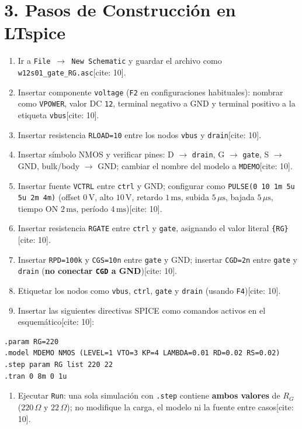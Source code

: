 \documentclass[11pt, a4paper]{article}
\begin{document}
\section*{3. Pasos de Construcción en LTspice}
\begin{enumerate}[noitemsep]
    \item Ir a \texttt{File $\to$ New Schematic} y guardar el archivo como \texttt{w12s01\_gate\_RG.asc}[cite: 10].
    \item Insertar componente \texttt{voltage} (\texttt{F2} en configuraciones habituales): nombrar como \texttt{VPOWER}, valor DC \texttt{12}, terminal negativo a GND y terminal positivo a la etiqueta \texttt{vbus}[cite: 10].
    \item Insertar resistencia \texttt{RLOAD=10} entre los nodos \texttt{vbus} y \texttt{drain}[cite: 10].
    \item Insertar símbolo NMOS y verificar pines: D $\to$ \texttt{drain}, G $\to$ \texttt{gate}, S $\to$ GND, bulk/body $\to$ GND; cambiar el nombre del modelo a \texttt{MDEMO}[cite: 10].
    \item Insertar fuente \texttt{VCTRL} entre \texttt{ctrl} y GND; configurar como \texttt{PULSE(0 10 1m 5u 5u 2m 4m)} (offset $0\,\text{V}$, alto $10\,\text{V}$, retardo $1\,\text{ms}$, subida $5\,\mu\text{s}$, bajada $5\,\mu\text{s}$, tiempo ON $2\,\text{ms}$, período $4\,\text{ms}$)[cite: 10].
    \item Insertar resistencia \texttt{RGATE} entre \texttt{ctrl} y \texttt{gate}, asignando el valor literal \texttt{\{RG\}}[cite: 10].
    \item Insertar \texttt{RPD=100k} y \texttt{CGS=10n} entre \texttt{gate} y GND; insertar \texttt{CGD=2n} entre \texttt{gate} y \texttt{drain} (\textbf{no conectar \texttt{CGD} a GND})[cite: 10].
    \item Etiquetar los nodos como \texttt{vbus}, \texttt{ctrl}, \texttt{gate} y \texttt{drain} (usando \texttt{F4})[cite: 10].
    \item Insertar las siguientes directivas SPICE como comandos activos en el esquemático[cite: 10]:
\end{enumerate}

\begin{lstlisting}[style=spice]
.param RG=220
.model MDEMO NMOS (LEVEL=1 VTO=3 KP=4 LAMBDA=0.01 RD=0.02 RS=0.02)
.step param RG list 220 22
.tran 0 8m 0 1u
\end{lstlisting}

\begin{enumerate}[resume]
    \item Ejecutar \texttt{Run}: una sola simulación con \texttt{.step} contiene \textbf{ambos valores} de $R_G$ ($220\,\Omega$ y $22\,\Omega$); no modifique la carga, el modelo ni la fuente entre casos[cite: 10].
\end{enumerate}
\end{document}
